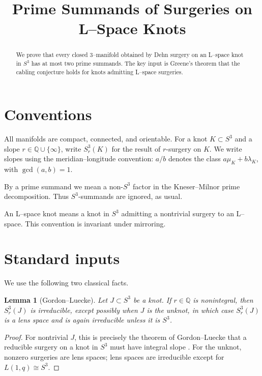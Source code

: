 \documentclass[11pt]{article}
\title{Prime Summands of Surgeries on L--Space Knots}
\date{}
\newtheorem{lemma}[theorem]{Lemma}
\begin{document}
\maketitle

\begin{abstract}
We prove that every closed 3--manifold obtained by Dehn surgery on an
L--space knot in \(S^3\) has at most two prime summands.  The key input is
Greene's theorem that the cabling conjecture holds for knots admitting
L--space surgeries.
\end{abstract}

\section*{Conventions}

All manifolds are compact, connected, and orientable.  For a knot
\(K \subset S^3\) and a slope \(r \in \mathbb Q \cup \{\infty\}\), write
\(S^3_r(K)\) for the result of \(r\)-surgery on \(K\).  We write slopes using
the meridian--longitude convention: \(a/b\) denotes the class
\(a\mu_K+b\lambda_K\), with \(\gcd(a,b)=1\).

By a prime summand we mean a non-\(S^3\) factor in the Kneser--Milnor prime
decomposition.  Thus \(S^3\)-summands are ignored, as usual.

An L--space knot means a knot in \(S^3\) admitting a nontrivial surgery to an
L--space.  This convention is invariant under mirroring.

\section*{Standard inputs}

We use the following two classical facts.

\begin{lemma}[Gordon--Luecke]\label{lem:nonintegral}
Let \(J \subset S^3\) be a knot.  If \(r \in \mathbb Q\) is nonintegral, then
\(S^3_r(J)\) is irreducible, except possibly when \(J\) is the unknot, in which
case \(S^3_r(J)\) is a lens space and is again irreducible unless it is
\(S^3\).
\end{lemma}

\begin{proof}
For nontrivial \(J\), this is precisely the theorem of Gordon--Luecke that a
reducible surgery on a knot in \(S^3\) must have integral slope
\cite[Theorem~1]{GL}.  For the unknot, nonzero surgeries are lens spaces; lens
spaces are irreducible except for \(L(1,q)\cong S^3\).
\end{proof}
\end{document}
